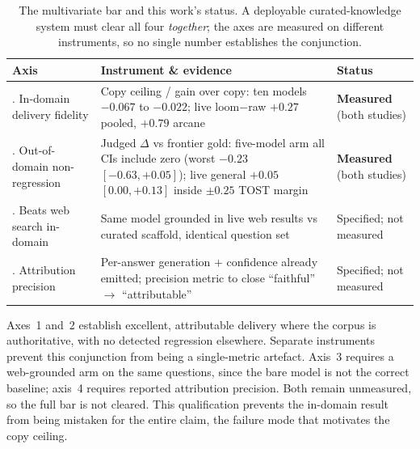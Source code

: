 \documentclass[10pt,twocolumn]{article}
\begin{document}
\begin{table}[t]\centering\small
\caption{The multivariate bar and this work's status. A deployable curated-knowledge system must clear
all four \emph{together}; the axes are measured on different instruments, so no single number
establishes the conjunction.}
\label{tab:bar}
\renewcommand{\arraystretch}{1.2}
\begin{tabularx}{\textwidth}{@{}>{\raggedright\arraybackslash}p{3.5cm} >{\raggedright\arraybackslash}X >{\raggedright\arraybackslash}p{3.6cm}@{}}
\toprule
Axis & Instrument \& evidence & Status \\
\midrule
1. In-domain delivery fidelity & Copy ceiling / gain over copy: ten models $-0.067$ to $-0.022$; live loom$-$raw $+0.27$ pooled, $+0.79$ arcane & \textbf{Measured} (both studies) \\
2. Out-of-domain non-regression & Judged $\Delta$ vs frontier gold: five-model arm all CIs include zero (worst $-0.23$ $[-0.63,+0.05]$); live general $+0.05$ $[0.00,+0.13]$ inside $\pm0.25$ TOST margin & \textbf{Measured} (both studies) \\
3. Beats web search in-domain & Same model grounded in live web results vs curated scaffold, identical question set & Specified; not measured \\
4. Attribution precision & Per-answer generation $+$ confidence already emitted; precision metric to close ``faithful'' $\to$ ``attributable'' & Specified; not measured \\
\bottomrule
\end{tabularx}
\end{table}

Axes~1 and~2 establish excellent, attributable delivery where the corpus is authoritative, with no detected regression elsewhere. Separate instruments prevent this conjunction from being a single-metric artefact. Axis~3 requires a web-grounded arm on the same questions, since the bare model is not the correct baseline; axis~4 requires reported attribution precision. Both remain unmeasured, so the full bar is not cleared. This qualification prevents the in-domain result from being mistaken for the entire claim, the failure mode that motivates the copy ceiling.
\end{document}
